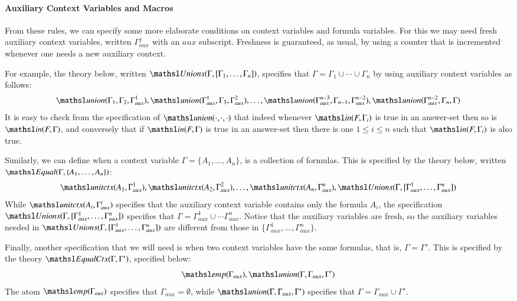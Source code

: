 \documentclass{new_tlp}
\newcommand{\elin}[2]{\ensuremath{{\tsl{unitctx}(\ensuremath{#1}, \ensuremath{#2})}}}
\newcommand{\emp}[1]{\ensuremath{{\tsl{emp}(\ensuremath{#1})}}}
\newcommand{\union}[3]{\ensuremath{{\tsl{union}(\ensuremath{#1},\ensuremath{#2},\ensuremath{ #3})}}}
\newcommand{\In}[2]{\ensuremath{\tsl{in}(\ensuremath{#1},\ensuremath{#2})}}
\newcommand{\unions}[2]{\ensuremath{\tsl{Unions}(\ensuremath{#1},\ensuremath{#2})}}
\newcommand{\equal}[2]{\ensuremath{\tsl{Equal}(\ensuremath{#1},\ensuremath{#2})}}
\newcommand{\equalCtx}[2]{\ensuremath{\tsl{EqualCtx}(\ensuremath{#1},\ensuremath{#2})}}
\begin{document}
\paragraph{Auxiliary Context Variables and Macros}
% 
From these rules, we can specify some more elaborate conditions on context   
variables and formula variables. For this we may need fresh auxiliary context variables,
written $\Gamma_{aux}^j$ with an $aux$ subscript. Freshness is guaranteed, as usual, by using a counter 
that is incremented whenever one needs a new auxiliary context.

For example, the theory below, written $\unions{\Gamma}{[\Gamma_1, \ldots, \Gamma_n]}$, 
specifies that $\Gamma = \Gamma_1 \cup \cdots \cup \Gamma_n$ by using auxiliary 
context variables as follows:
\[
 \union{\Gamma_1}{\Gamma_2}{\Gamma_{aux}^1}, \union{\Gamma_{aux}^1}{\Gamma_3}{\Gamma_{aux}^2},
 \ldots, \union{\Gamma_{aux}^{n-3}}{\Gamma_{n-1}}{\Gamma_{aux}^{n-2}}, \union{\Gamma_{aux}^{n-2}}{\Gamma_n}{\Gamma} 
\]
It is easy to check from the specification of $\union{\cdot}{\cdot}{\cdot}$ that indeed 
whenever $\In{F}{\Gamma_i}$ is true in an answer-set then so is $\In{F}{\Gamma}$, and 
conversely that if $\In{F}{\Gamma}$ is true in an answer-set then there is one $1 \leq i\leq n$
such that $\In{F}{\Gamma_i}$ is also true.

Similarly, we can define when a context variable $\Gamma = \{A_1, \ldots, A_n\}$, 
is a collection of formulas. This is specified by the theory below, written 
$\equal{\Gamma}{\{A_1, \ldots, A_n\}}$:
\[
 \elin{A_1}{\Gamma_{aux}^1}, \elin{A_2}{\Gamma_{aux}^2}, \ldots, \elin{A_n}{\Gamma_{aux}^n}, 
 \unions{\Gamma}{[\Gamma_{aux}^1, \ldots, \Gamma_{aux}^n]}
\]
While $\elin{A_i}{\Gamma_{aux}^i}$ specifies that the auxiliary context variable 
contains only the formula $A_i$, the specification $\unions{\Gamma}{[\Gamma_{aux}^1, \ldots, \Gamma_{aux}^n]}$
specifies that $\Gamma = \Gamma_{aux}^1 \cup \cdots \Gamma_{aux}^n$. Notice that
the auxiliary variables are fresh, so the auxiliary variables needed in 
$\unions{\Gamma}{[\Gamma_{aux}^1, \ldots, \Gamma_{aux}^n]}$ are different from 
those in $\{\Gamma_{aux}^1, \ldots, \Gamma_{aux}^n\}$.

Finally, another specification that we will need is when two context variables 
have the same formulas, that is, $\Gamma = \Gamma'$. This is specified by the 
theory $\equalCtx{\Gamma}{\Gamma'}$, specified below:
\[
 \emp{\Gamma_{aux}}, \union{\Gamma}{\Gamma_{aux}}{\Gamma'}
\]
The atom $\emp{\Gamma_{aux}}$ specifies that $\Gamma_{aux} = \emptyset$, while  
$\union{\Gamma}{\Gamma_{aux}}{\Gamma'}$ specifies that $\Gamma = \Gamma_{aux} \cup \Gamma'$.
% 
\end{document}
